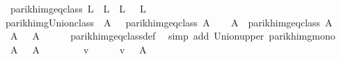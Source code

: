 \begin{isabellebody}
\ \ {\isachardoublequoteopen}parikh{\isacharunderscore}{\kern0pt}img{\isacharunderscore}{\kern0pt}eq{\isacharunderscore}{\kern0pt}class\ L\ {\isasymequiv}\ {\isacharbraceleft}{\kern0pt}L{\isacharprime}{\kern0pt}{\isachardot}{\kern0pt}\ {\isasymPsi}\ L{\isacharprime}{\kern0pt}\ {\isacharequal}{\kern0pt}\ {\isasymPsi}\ L{\isacharbraceright}{\kern0pt}{\isachardoublequoteclose}\isanewline
\isanewline
{}\isamarkupfalse%
\ parikh{\isacharunderscore}{\kern0pt}img{\isacharunderscore}{\kern0pt}Union{\isacharunderscore}{\kern0pt}class{\isacharcolon}{\kern0pt}\ {\isachardoublequoteopen}{\isasymPsi}\ A\ {\isacharequal}{\kern0pt}\ {\isasymPsi}\ {\isacharparenleft}{\kern0pt}{\isasymUnion}{\isacharparenleft}{\kern0pt}parikh{\isacharunderscore}{\kern0pt}img{\isacharunderscore}{\kern0pt}eq{\isacharunderscore}{\kern0pt}class\ A{\isacharparenright}{\kern0pt}{\isacharparenright}{\kern0pt}{\isachardoublequoteclose}\isanewline
%
\isadelimproof
%
\endisadelimproof
%
\isatagproof
{}\isamarkupfalse%
\isanewline
\ \ \isamarkupfalse%
\ {\isacharquery}{\kern0pt}A{\isacharprime}{\kern0pt}\ {\isacharequal}{\kern0pt}\ {\isachardoublequoteopen}{\isasymUnion}{\isacharparenleft}{\kern0pt}parikh{\isacharunderscore}{\kern0pt}img{\isacharunderscore}{\kern0pt}eq{\isacharunderscore}{\kern0pt}class\ A{\isacharparenright}{\kern0pt}{\isachardoublequoteclose}\isanewline
\ \ \isamarkupfalse%
\ {\isachardoublequoteopen}{\isasymPsi}\ A\ {\isasymsubseteq}\ {\isasymPsi}\ {\isacharquery}{\kern0pt}A{\isacharprime}{\kern0pt}{\isachardoublequoteclose}\isanewline
\ \ \ \ \isamarkupfalse%
\ parikh{\isacharunderscore}{\kern0pt}img{\isacharunderscore}{\kern0pt}eq{\isacharunderscore}{\kern0pt}class{\isacharunderscore}{\kern0pt}def\ \isamarkupfalse%
\ {\isacharparenleft}{\kern0pt}simp\ add{\isacharcolon}{\kern0pt}\ Union{\isacharunderscore}{\kern0pt}upper\ parikh{\isacharunderscore}{\kern0pt}img{\isacharunderscore}{\kern0pt}mono{\isacharparenright}{\kern0pt}\isanewline
\ \ \isamarkupfalse%
\ {\isachardoublequoteopen}{\isasymPsi}\ {\isacharquery}{\kern0pt}A{\isacharprime}{\kern0pt}\ {\isasymsubseteq}\ {\isasymPsi}\ A{\isachardoublequoteclose}\isanewline
\ \ \isamarkupfalse%
\isanewline
\ \ \ \ \isamarkupfalse%
\ v\isanewline
\ \ \ \ \isamarkupfalse%
\ {\isachardoublequoteopen}v\ {\isasymin}\ {\isasymPsi}\ {\isacharquery}{\kern0pt}A{\isacharprime}{\kern0pt}{\isachardoublequoteclose}\isanewline
\ \ \ \ \isamarkupfalse%

\end{isabellebody}
